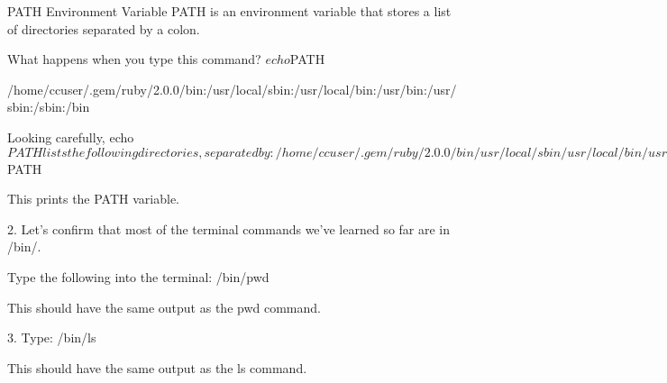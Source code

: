 PATH Environment Variable
    PATH is an environment variable that stores a list of directories separated by a colon.

    What happens when you type this command?
        $ echo $PATH

        /home/ccuser/.gem/ruby/2.0.0/bin:/usr/local/sbin:/usr/local/bin:/usr/bin:/usr/sbin:/sbin:/bin
    
    Looking carefully, echo $PATH lists the following directories, separated by :
        /home/ccuser/.gem/ruby/2.0.0/bin
        /usr/local/sbin
        /usr/local/bin
        /usr/bin
        /usr/sbin
        /sbin
        /bin

    Each directory contains scripts for the command line to execute. The PATH variable simply lists which directories contain scripts.

    For example, many commands we’ve learned are scripts stored in the /bin directory.
    
        /bin/pwd
    This is the script that is executed when you type the pwd command.
       
        /bin/ls
    This is the script that is executed when you type the ls command.

    In advanced cases, you can customize the PATH variable when adding scripts of your own.

Instructions
    1.
    In the command line, type:
        echo $PATH 
    
    This prints the PATH variable.

    2.
    Let’s confirm that most of the terminal commands we’ve learned so far are in /bin/.

    Type the following into the terminal:
        /bin/pwd 
    
    This should have the same output as the pwd command.

    3.
    Type:
        /bin/ls 
    
    This should have the same output as the ls command. 